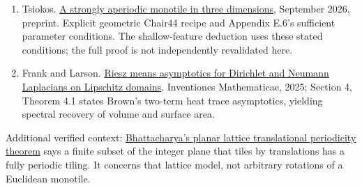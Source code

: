 \documentclass[11pt]{article}
\begin{document}
\begin{enumerate}
\item \hypertarget{ref20}{}Tsiokos. \href{https://arxiv.org/abs/2609.19214}{A strongly aperiodic monotile in three dimensions}, September 2026, preprint. Explicit geometric Chair44 recipe and Appendix E.6's sufficient parameter conditions. The shallow-feature deduction uses these stated conditions; the full proof is not independently revalidated here.

\item \hypertarget{ref21}{}Frank and Larson. \href{https://link.springer.com/article/10.1007/s00222-025-01352-x}{Riesz means asymptotics for Dirichlet and Neumann Laplacians on Lipschitz domains}. Inventiones Mathematicae, 2025; Section 4, Theorem 4.1 states Brown's two-term heat trace asymptotics, yielding spectral recovery of volume and surface area.

\end{enumerate}


Additional verified context: \href{https://arxiv.org/abs/1602.05738}{Bhattacharya's planar lattice translational periodicity theorem} says a finite subset of the integer plane that tiles by translations has a fully periodic tiling. It concerns that lattice model, not arbitrary rotations of a Euclidean monotile.
\end{document}
